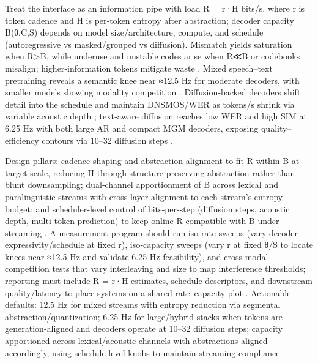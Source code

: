 Treat the interface as an information pipe with load R = r·H bits/s, where r is token cadence and H is per‑token entropy after abstraction; decoder capacity B(θ,C,S) depends on model size/architecture, compute, and schedule (autoregressive vs masked/grouped vs diffusion). Mismatch yields saturation when R>B, while underuse and unstable codes arise when R≪B or codebooks misalign; higher‑information tokens mitigate waste \cite{huang2024repcodecspeechrepresentationcodectokeniz,chen2023reducingbarriersselfsupervisedlearninghu}. Mixed speech–text pretraining reveals a semantic knee near ≈12.5 Hz for moderate decoders, with smaller models showing modality competition \cite{zeng2024scalingspeechtextpretrainingsyntheticint}. Diffusion‑backed decoders shift detail into the schedule and maintain DNSMOS/WER as tokens/s shrink via variable acoustic depth \cite{yang2025diffsoundstreamefficientspeechtokenizati}; text‑aware diffusion reaches low WER and high SIM at 6.25 Hz with both large AR and compact MGM decoders, exposing quality–efficiency contours via 10–32 diffusion steps \cite{wang2025tadicodectextawarediffusionspeechtokeniz}.

Design pillars: cadence shaping and abstraction alignment to fit R within B at target scale, reducing H through structure‑preserving abstraction rather than blunt downsampling; dual‑channel apportionment of B across lexical and paralinguistic streams with cross‑layer alignment to each stream’s entropy budget; and scheduler‑level control of bits‑per‑step (diffusion steps, acoustic depth, multi‑token prediction) to keep online R compatible with B under streaming \cite{zeng2024scalingspeechtextpretrainingsyntheticint,yang2025diffsoundstreamefficientspeechtokenizati,wang2025tadicodectextawarediffusionspeechtokeniz}. A measurement program should run iso‑rate sweeps (vary decoder expressivity/schedule at fixed r), iso‑capacity sweeps (vary r at fixed θ/S to locate knees near ≈12.5 Hz and validate 6.25 Hz feasibility), and cross‑modal competition tests that vary interleaving and size to map interference thresholds; reporting must include R = r·H estimates, schedule descriptors, and downstream quality/latency to place systems on a shared rate–capacity plot \cite{zeng2024scalingspeechtextpretrainingsyntheticint,yang2025diffsoundstreamefficientspeechtokenizati,wang2025tadicodectextawarediffusionspeechtokeniz}. Actionable defaults: 12.5 Hz for mixed streams with entropy reduction via segmental abstraction/quantization; 6.25 Hz for large/hybrid stacks when tokens are generation‑aligned and decoders operate at 10–32 diffusion steps; capacity apportioned across lexical/acoustic channels with abstractions aligned accordingly, using schedule‑level knobs to maintain streaming compliance.

